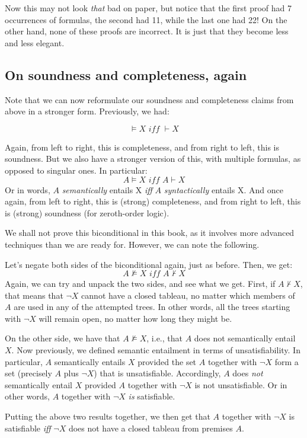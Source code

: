 Now this may not look \textit{that} bad on paper, but notice that the first proof had 7 occurrences of formulas, the second had 11, while the last one had 22! On the other hand, none of these proofs are incorrect. It is just that they become less and less elegant.

\subsection{On soundness and completeness, again}

Note that we can now reformulate our soundness and completeness claims from above in a stronger form. Previously, we had:

\[
\models X \textit{ iff } \vdash X
\]

Again, from left to right, this is completeness, and from right to left, this is soundness. But we also have a stronger version of this, with multiple formulas, as opposed to singular ones. In particular:
%
\[
A \models X \textit{ iff } A \vdash X
\] 
%
Or in words, $A$ \textit{semantically} entails X \textit{iff} $A$ \textit{syntactically} entails X. And once again, from left to right, this is (strong) completeness, and from right to left, this is (strong) soundness (for zeroth-order logic). 

We shall not prove this biconditional in this book, as it involves more advanced techniques than we are ready for. However, we can note the following. 

Let's negate both sides of the biconditional again, just as before. Then, we get: 
%
\[
A \not\models X \textit{ iff } A \nvdash X
\] 
%
Again, we can try and unpack the two sides, and see what we get. First, if $A \nvdash X$, that means that $\neg X$ cannot have a closed tableau, no matter which members of $A$ are used in any of the attempted trees. In other words, all the trees starting with $\neg X$ will remain open, no matter how long they might be. 

On the other side, we have that $A \not\models X$, i.e., that $A$ does not semantically entail $X$. Now previously, we defined semantic entailment in terms of unsatisfiability. In particular, $A$ semantically entails $X$ provided the set $A$ together with $\neg X$ form a set (precisely $A$ plus $\neg X$) that is unsatisfiable. Accordingly, $A$ does \textit{not} semantically entail $X$ provided $A$ together with $\neg X$ is not unsatisfiable. Or in other words, $A$ together with $\neg X$ \textit{is} satisfiable.

Putting the above two results together, we then get that $A$ together with $\neg X$ is satisfiable \textit{iff} $\neg X$ does not have a closed tableau from premises $A$. 

